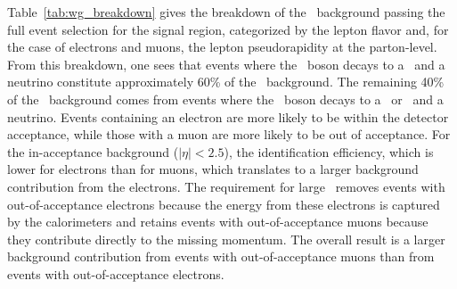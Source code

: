 Table~\ref{tab:wg_breakdown} gives the breakdown of the \wlng\ background passing the full event selection for the signal region, categorized by the lepton flavor and, for the case of electrons and muons, the lepton pseudorapidity at the parton-level. 
From this breakdown, one sees that events where the \PW\ boson decays to a \Pgt\ and a neutrino constitute approximately 60\% of the \wlng\ background. 
The remaining 40\% of the \wlng\ background comes from events where the \PW\ boson decays to a \Pgm\ or \Pe\ and a neutrino.
Events containing an electron are more likely to be within the detector acceptance, while those with a muon are more likely to be out of acceptance.
For the in-acceptance background ($|\eta| < 2.5$), the identification efficiency, which is lower for electrons than for muons, which translates to a larger background contribution from the electrons. 
The requirement for large \met\ removes events with out-of-acceptance electrons because the energy from these electrons is captured by the calorimeters and retains events with out-of-acceptance muons because they contribute directly to the missing momentum.
The overall result is a larger background contribution from events with out-of-acceptance muons than from events with out-of-acceptance electrons.  

